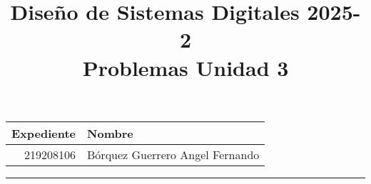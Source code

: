 \documentclass[a4paper, 12pt]{article}
\title
{
    Diseño de Sistemas Digitales 2025-2 \\
    Problemas Unidad 3
}
\begin{document}
    \maketitle

    \begin{center}
        \begin{tabular}{r|l}
            \textbf{Expediente} & \textbf{Nombre} \\ \hline
            219208106 & Bórquez Guerrero Angel Fernando \\
        \end{tabular}
    \end{center}

    \rule{\linewidth}{0.3mm}



    \vspace{0.3cm}
\end{document}
